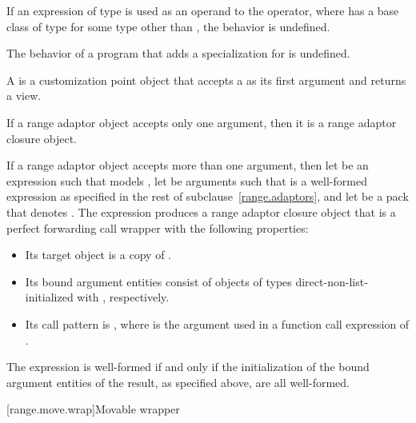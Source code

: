 \pnum
If an expression of type \cv{} 
is used as an operand to the \tcode{|} operator,
where  has a base class of type 
for some type  other than , the behavior is undefined.

\pnum
The behavior of a program
that adds a specialization for  is undefined.

\pnum
A  is a
customization point object
that accepts a  as its first argument and returns a view.

\pnum
If a range adaptor object accepts only one argument,
then it is a range adaptor closure object.

\pnum
If a range adaptor object  accepts more than one argument,
then let  be an expression
such that  models ,
let  be arguments
such that  is a well-formed expression
as specified in the rest of subclause~\ref{range.adaptors}, and
let  be a pack
that denotes .
The expression  produces a range adaptor closure object 
that is a perfect forwarding call wrapper with the following properties:
\begin{itemize}
\item
Its target object is a copy of .
\item
Its bound argument entities  consist of objects of types  direct-non-list-initialized with , respectively.
\item
Its call pattern is ,
where  is the argument used in a function call expression of .
\end{itemize}
The expression  is well-formed if and only if
the initialization of the bound argument entities of the result,
as specified above, are all well-formed.

[range.move.wrap]{Movable wrapper}

